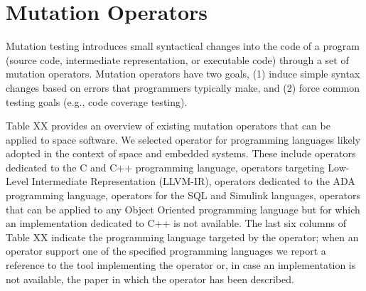 
\section{Mutation Operators}
\label{sec:operators}

Mutation testing introduces small syntactical changes into the code of a program (source code, intermediate representation, or executable code) through a set of mutation operators.
Mutation operators have two goals, (1) induce simple syntax changes based on errors that programmers typically make, and (2) force common testing goals (e.g., code coverage testing).

Table XX provides an overview of existing mutation operators that can be applied to space software.
We selected operator for programming languages likely adopted in the context of space and embedded systems. These include operators dedicated to the C and C++ programming language, operators targeting Low-Level Intermediate Representation (LLVM-IR), operators dedicated to the ADA programming language, operators for the SQL and Simulink languages, operators that can be applied to any Object Oriented programming language but for which an implementation dedicated to C++ is not available. The last six columns of Table XX indicate the programming language targeted by the operator; when an operator support one of the specified programming languages we report a reference to the tool implementing the operator or, in case an implementation is not available, the paper in which the operator has been described.

